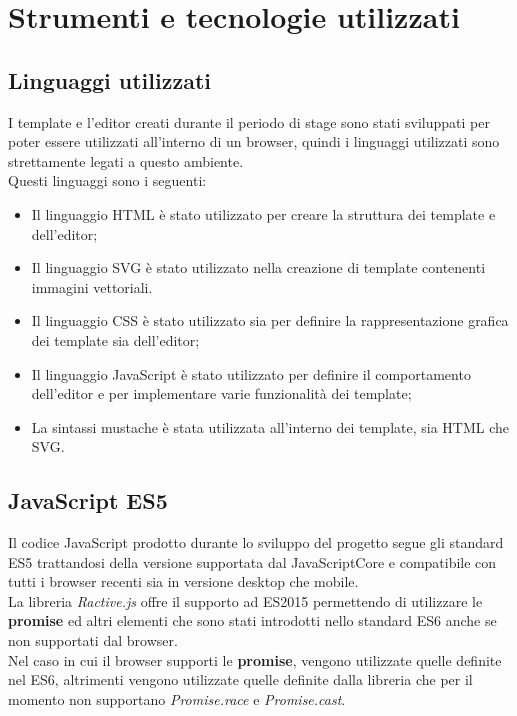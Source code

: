 
\chapter{Strumenti e tecnologie utilizzati}
\label{cap:strumenti-tecnologie}
\section{Linguaggi utilizzati}
I template e l'editor creati durante il periodo di stage sono stati sviluppati per poter essere utilizzati all'interno di un browser, quindi i linguaggi utilizzati sono strettamente legati a questo ambiente.\\
Questi linguaggi sono i seguenti:
\begin{itemize}
	\item Il linguaggio HTML è stato utilizzato per creare la struttura dei template e dell'editor;
	\item Il linguaggio SVG è stato utilizzato nella creazione di template contenenti immagini vettoriali.
	\item Il linguaggio CSS è stato utilizzato sia per definire la rappresentazione grafica dei template sia dell'editor;
	\item Il linguaggio JavaScript è stato utilizzato per definire il comportamento dell'editor e per implementare varie funzionalità dei template;
	\item La sintassi mustache è stata utilizzata all'interno dei template, sia  HTML che SVG. 
\end{itemize}

\section{JavaScript ES5}
Il codice JavaScript prodotto durante lo sviluppo del progetto segue gli standard ES5 trattandosi della versione supportata dal JavaScriptCore e compatibile con tutti i browser recenti sia in versione desktop che mobile.\\
La libreria \textit{Ractive.js} offre il supporto ad ES2015 permettendo di utilizzare le \textbf{promise} ed altri elementi che sono stati introdotti nello standard ES6 anche se non supportati dal browser.\\
Nel caso in cui il browser supporti le \textbf{promise}, vengono utilizzate quelle definite nel ES6, altrimenti vengono utilizzate quelle definite dalla libreria che per il momento non supportano \textit{Promise.race} e \textit{Promise.cast}.

